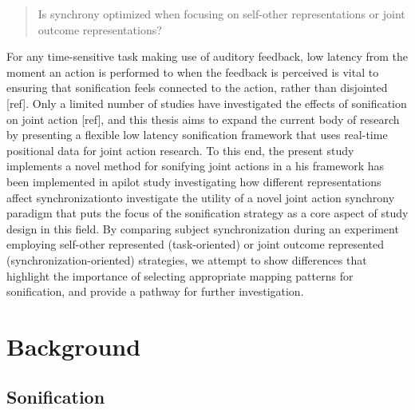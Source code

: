 \documentclass[10pt,a4paper,onecolumn]{article}
\begin{document}
\begin{quote}
Is synchrony optimized when focusing on self-other representations or joint outcome representations?
\end{quote}

For any time-sensitive task making use of auditory feedback, low latency from the moment an action is performed to when the feedback is perceived is vital to ensuring that sonification feels connected to the action, rather than disjointed {[}ref{]}. Only a limited number of studies have investigated the effects of sonification on joint action {[}ref{]}, and this thesis aims to expand the current body of research by presenting a flexible low latency sonification framework that uses real-time positional data for joint action research. To this end, the present study implements a novel method for sonifying joint actions in a his framework has been implemented in apilot study investigating how different representations affect synchronizationto investigate the utility of a novel joint action synchrony paradigm that puts the focus of the sonification strategy as a core aspect of study design in this field. By comparing subject synchronization during an experiment employing self-other represented (task-oriented) or joint outcome represented (synchronization-oriented) strategies, we attempt to show differences that highlight the importance of selecting appropriate mapping patterns for sonification, and provide a pathway for further investigation.

\hypertarget{background}{%
\section{Background}\label{background}}

\hypertarget{sonification}{%
\subsection{Sonification}\label{sonification}}
\end{document}
